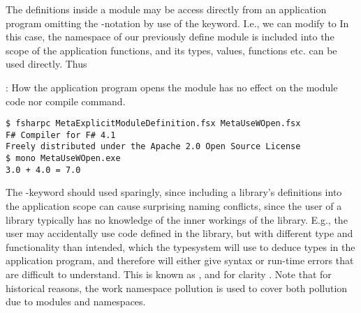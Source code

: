 The definitions inside a module may be access directly from an application program omitting the -notation by use of the  keyword. I.e., we can modify  to
%
%
In this case, the namespace of our previously define module is included into the scope of the application functions, and its types, values, functions etc. can be used directly. Thus
\begin{codeNOutput}{: How the application program opens the module has no effect on the module code nor compile command.}
\begin{lstlisting}[language=console,escapechar=§]
$ fsharpc MetaExplicitModuleDefinition.fsx MetaUseWOpen.fsx
F# Compiler for F# 4.1
Freely distributed under the Apache 2.0 Open Source License
$ mono MetaUseWOpen.exe 
3.0 + 4.0 = 7.0
\end{lstlisting}
\end{codeNOutput}
The -keyword should used sparingly, since including a library's definitions into the application scope can cause surprising naming conflicts, since the user of a library typically has no knowledge of the inner workings of the library. E.g., the user may accidentally use code defined in the library, but with different type and functionality than intended, which the typesystem will use to deduce types in the application program, and therefore will either give syntax or run-time errors that are difficult to understand.  This is known as , and for clarity . Note that for historical reasons, the work namespace pollution is used to cover both pollution due to modules and namespaces.

